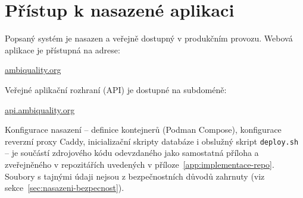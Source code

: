 \chapter{Přístup k nasazené aplikaci}
\label{app:nasazeni}

Popsaný systém je nasazen a veřejně dostupný v produkčním provozu. Webová aplikace je přístupná na adrese:

\begin{center}
\href{https://ambiquality.org}{ambiquality.org}
\end{center}

Veřejné aplikační rozhraní (API) je dostupné na subdoméně:

\begin{center}
\href{https://api.ambiquality.org}{api.ambiquality.org}
\end{center}

Konfigurace nasazení -- definice kontejnerů (Podman Compose), konfigurace reverzní proxy Caddy, inicializační skripty databáze i obslužný skript \texttt{deploy.sh} -- je součástí zdrojového kódu odevzdaného jako samostatná příloha a zveřejněného v repozitářích uvedených v příloze~\ref{app:implementace-repo}. Soubory s tajnými údaji nejsou z bezpečnostních důvodů zahrnuty (viz sekce~\ref{sec:nasazeni-bezpecnost}).
